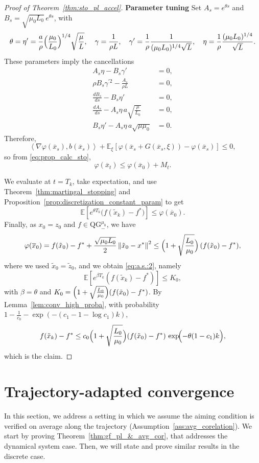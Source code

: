 \documentclass{article}
\newcommand{\E}[1]{\mathbb{E}\left[#1 \right]}
\newcommand{\norm}[1]{\left\lVert#1\right\rVert}
\newcommand{\dotprod}[1]{\left< #1\right>}
\newcommand{\qginf}{\text{QG}_{-}^{\mu_0}}
\theoremstyle{plain}
\theoremstyle{definition}
\theoremstyle{remark}
\begin{document}
\begin{proof}[Proof of Theorem~\ref{thm:sto_pl_accel}]
\noindent
\textbf{Parameter tuning \:}
Set $A_s = e^{\theta s}$ and $B_s = \sqrt{\mu_0 L_0}\,e^{\theta s}$, with
\[
\theta=\eta'=\frac{a}{\rho}\Bigl(\frac{\mu_0}{L_0}\Bigr)^{1/4}\sqrt{\frac{\mu}{L}},
\quad
\gamma=\frac{1}{\rho L},
\quad
\gamma'=\frac{1}{\rho}\frac{1}{(\mu_0 L_0)^{1/4}\sqrt{L}},
\quad
\eta=\frac{1}{\rho}\frac{(\mu_0 L_0)^{1/4}}{\sqrt{L}}.
\]
These parameters imply the cancellations
\begin{align}
A_s\eta - B_s \gamma' &= 0,\label{eq:cancel_param:0}\\
\rho B_s \gamma^{'2} - \frac{A_s}{\rho L} &= 0,\label{eq:cancel_param:1}\\
\frac{dB_s}{ds}-B_s \eta' &= 0,\label{eq:cancel_param:2}\\
\frac{dA_s}{ds}- A_s \eta\,a \sqrt{\frac{\mu}{L_0}} &= 0,\label{eq:cancel_param:3}\\
B_s \eta' - A_s \eta\,a \sqrt{\mu\mu_0} &= 0.\label{eq:cancel_param:4}
\end{align}
Therefore,
\[
\dotprod{\nabla \varphi(\overline{x}_s),b(\overline{x}_s)}
+ \mathbb{E}_{\xi}\!\left[\varphi(\overline{x}_s+ G(\overline{x}_s,\xi)) - \varphi(\overline{x}_s)\right] \le 0,
\]
so from \eqref{eq:prop_calc_sto},
\[
\varphi(\overline{x}_t) \le \varphi(\overline{x}_0) + M_t.
\]

We evaluate at $t=T_k$, take expectation, and use Theorem~\ref{thm:martingal_stopping} and
Proposition~\ref{prop:discretization_constant_param} to get
\[
\E{e^{\theta T_k}\bigl(f(\tilde x_k)-f^\ast\bigr)} \le \varphi(\overline{x}_0).
\]
Finally, as $x_0 = z_0$ and $f\in \qginf$, we have
\[
\varphi(\overline{x}_0)
= f(\tilde x_0)-f^\ast + \frac{\sqrt{\mu_0 L_0}}{2}\norm{\tilde x_0-x^\ast}^2
\le \Bigl(1+\sqrt{\frac{L_0}{\mu_0}}\Bigr)\,(f(\tilde x_0)-f^\ast),
\]
where we used $\tilde x_0 = \tilde z_0$,
and we obtain \eqref{eq:a.s.:2}, namely
\begin{equation*}   \mathbb{E}\left[e^{\beta T_k}(f(\tilde{x}_k)-f^\ast)\right] \le K_0,
         \end{equation*}with $\beta=\theta$ and $K_0=\Bigl(1+\sqrt{\frac{L_0}{\mu_0}}\Bigr)(f(\tilde x_0)-f^\ast)$.
By Lemma~\ref{lem:conv_high_proba}, with probability $1-\frac{1}{c_0}-\exp(-(c_1-1-\log c_1)k)$,
\[
f(\tilde x_k)-f^\ast
\le c_0\Bigl(1+\sqrt{\frac{L_0}{\mu_0}}\Bigr)(f(\tilde x_0)-f^\ast)\,
\exp\!\Bigl(-\theta(1-c_1)k\Bigr),
\]
which is the claim.
\end{proof}


\section{Trajectory-adapted convergence}\label{app:adptative_condition}
In this section, we address a setting in which we assume the aiming condition is verified on average along the trajectory (Assumption~\ref{ass:avg_corelation}).
We start by proving Theorem~\ref{thm:gf_pl_&_avg_cor}, that addresses the dynamical system case. Then, we will state and prove similar results in the discrete case.
\end{document}
